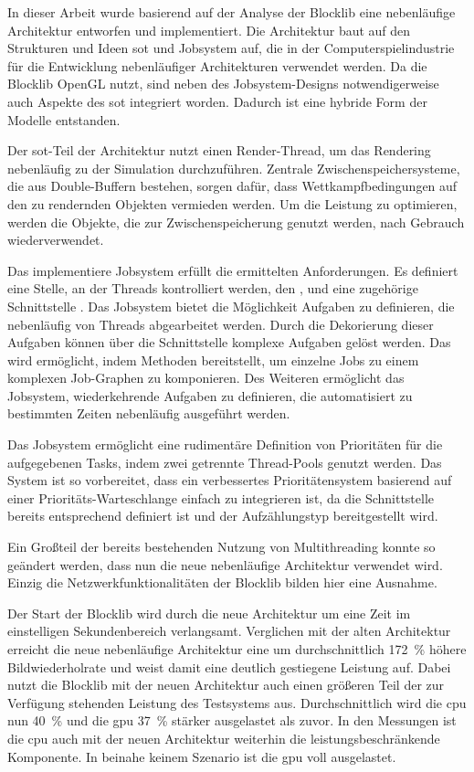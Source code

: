In dieser Arbeit wurde basierend auf der Analyse der Blocklib eine nebenläufige Architektur entworfen und implementiert. Die Architektur baut auf den Strukturen und Ideen \acf{sot} und Jobsystem auf, die in der Computerspielindustrie für die Entwicklung nebenläufiger Architekturen verwendet werden. Da die Blocklib OpenGL nutzt, sind neben des Jobsystem-Designs notwendigerweise auch Aspekte des \ac{sot} integriert worden. Dadurch ist eine hybride Form der Modelle entstanden.

Der \ac{sot}-Teil der Architektur nutzt einen Render-Thread, um das Rendering nebenläufig zu der Simulation durchzuführen. Zentrale Zwischenspeichersysteme, die aus Double-Buffern bestehen, sorgen dafür, dass Wettkampfbedingungen auf den zu rendernden Objekten vermieden werden. Um die Leistung zu optimieren, werden die Objekte, die zur Zwischenspeicherung genutzt werden, nach Gebrauch wiederverwendet.

Das implementiere Jobsystem erfüllt die ermittelten Anforderungen. Es definiert eine Stelle, an der Threads kontrolliert werden, den \classBlocklibExecutor{}, und eine zugehörige Schnittstelle \classBlocklibExecutorService{}. Das Jobsystem bietet die Möglichkeit Aufgaben zu definieren, die nebenläufig von Threads abgearbeitet werden. Durch die Dekorierung dieser Aufgaben können über die Schnittstelle \classCompletionStage{} komplexe Aufgaben gelöst werden. Das wird ermöglicht, indem \classCompletionStage{} Methoden bereitstellt, um einzelne Jobs zu einem komplexen Job-Graphen zu komponieren. Des Weiteren ermöglicht das Jobsystem, wiederkehrende Aufgaben zu definieren, die automatisiert zu bestimmten Zeiten nebenläufig ausgeführt werden.

Das Jobsystem ermöglicht eine rudimentäre Definition von Prioritäten für die aufgegebenen Tasks, indem zwei getrennte Thread-Pools genutzt werden. Das System ist so vorbereitet, dass ein verbessertes Prioritätensystem basierend auf einer Prioritäts-Warteschlange einfach zu integrieren ist, da die Schnittstelle \classBlocklibExecutorService{} bereits entsprechend definiert ist und der Aufzählungstyp \classTaskPriority{} bereitgestellt wird.

Ein Großteil der bereits bestehenden Nutzung von Multithreading konnte so geändert werden, dass nun die neue nebenläufige Architektur verwendet wird. Einzig die Netzwerkfunktionalitäten der Blocklib bilden hier eine Ausnahme.

Der Start der Blocklib wird durch die neue Architektur um eine Zeit im einstelligen Sekundenbereich verlangsamt. Verglichen mit der alten Architektur erreicht die neue nebenläufige Architektur eine um durchschnittlich \SI{172}{\percent} höhere Bildwiederholrate und weist damit eine deutlich gestiegene Leistung auf. Dabei nutzt die Blocklib mit der neuen Architektur auch einen größeren Teil der zur Verfügung stehenden Leistung des Testsystems aus. Durchschnittlich wird die \ac{cpu} nun \SI{40}{\percent} und die \ac{gpu} \SI{37}{\percent} stärker ausgelastet als zuvor. In den Messungen ist die \ac{cpu} auch mit der neuen Architektur weiterhin die leistungsbeschränkende Komponente. In beinahe keinem Szenario ist die \ac{gpu} voll ausgelastet.